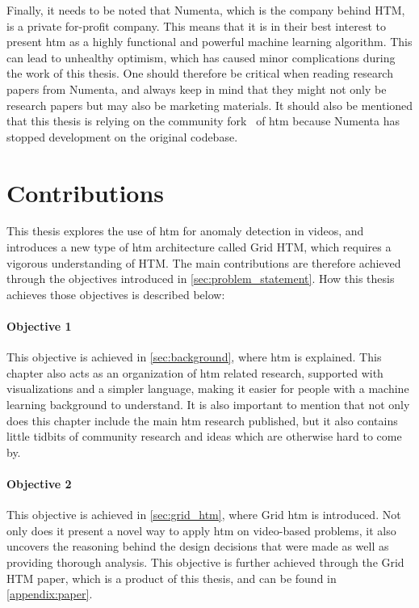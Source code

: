 \par
Finally, it needs to be noted that Numenta, which is the company behind HTM, is a private for-profit company. This means that it is in their best interest to present \gls*{htm} as a highly functional and powerful machine learning algorithm. This can lead to unhealthy optimism, which has caused minor complications during the work of this thesis. One should therefore be critical when reading research papers from Numenta, and always keep in mind that they might not only be research papers but may also be marketing materials. It should also be mentioned that this thesis is relying on the community fork~\cite{htm_community_fork} of \gls*{htm} because Numenta has stopped development on the original codebase.

\section{Contributions}
This thesis explores the use of \gls*{htm} for anomaly detection in videos, and introduces a new type of \gls*{htm} architecture called Grid HTM, which requires a vigorous understanding of HTM. The main contributions are therefore achieved through the objectives introduced in \autoref{sec:problem_statement}. How this thesis achieves those objectives is described below:
\paragraph*{Objective 1} \emph{}
\par
This objective is achieved in \autoref{sec:background}, where \gls*{htm} is explained. This chapter also acts as an organization of  \gls*{htm} related research, supported with visualizations and a simpler language, making it easier for people with a machine learning background to understand. It is also important to mention that not only does this chapter include the main \gls*{htm} research published, but it also contains little tidbits of community research and ideas which are otherwise hard to come by.
\paragraph*{Objective 2} \emph{}
\par
This objective is achieved in \autoref{sec:grid_htm}, where Grid \gls*{htm} is introduced. Not only does it present a novel way to apply  \gls*{htm} on video-based problems, it also uncovers the reasoning behind the design decisions that were made as well as providing thorough analysis. This objective is further achieved through the Grid HTM paper, which is a product of this thesis, and can be found in \autoref{appendix:paper}.

